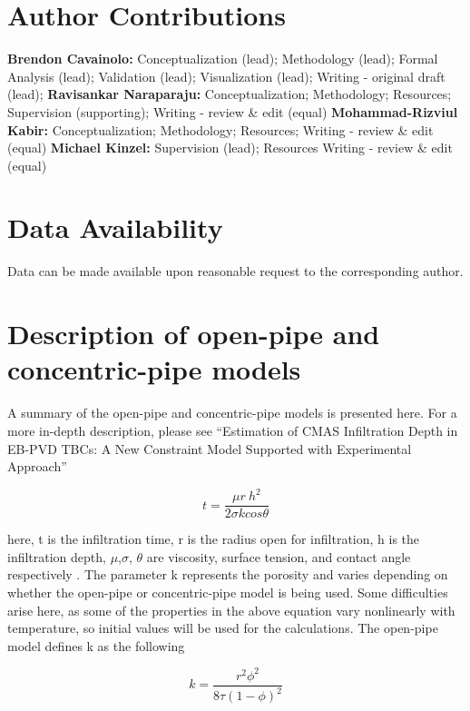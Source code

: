 \documentclass[%
 aip,
 amsmath,amssymb,
 reprint,%
floatfix]{revtex4-1}
\begin{document}
\section*{Author Contributions}
\textbf{Brendon Cavainolo:} Conceptualization (lead); Methodology (lead); Formal Analysis (lead); Validation (lead); Visualization (lead); Writing - original draft (lead);
\textbf{Ravisankar Naraparaju:} Conceptualization; Methodology; Resources; Supervision (supporting); Writing - review \& edit (equal)
\textbf{Mohammad-Rizviul Kabir:} Conceptualization; Methodology; Resources; Writing - review \& edit (equal)
\textbf{Michael Kinzel:} Supervision (lead); Resources Writing - review \& edit (equal)


\section*{Data Availability}
Data can be made available upon reasonable request to the corresponding author.

\appendix
\section{Description of open-pipe and concentric-pipe models}
\label{sec:app:RaviPipeModels}
A summary of the open-pipe and concentric-pipe models is presented here. For a more in-depth description, please see ``Estimation
of CMAS Infiltration Depth in EB-PVD TBCs: A New Constraint Model Supported with Experimental Approach''

\begin{equation}
    t=\frac{\mu r\ h^2}{2\sigma k cos\theta}
    \label{eq:PM_base}
\end{equation}

\noindent here, t is the infiltration time, r is the radius open for infiltration, h is the infiltration depth, $\mu$,$ \sigma$, $\theta$ are viscosity, surface tension, and contact angle respectively \cite{Naraparaju2017,ZHAO201474}. The parameter k represents the porosity and varies depending on whether the open-pipe or concentric-pipe model is being used. Some difficulties arise here, as some of the properties in the above equation vary nonlinearly with temperature, so initial values will be used for the calculations. The open-pipe model defines k as the following

\begin{equation}
    k=\frac{r^2\phi^2}{8\tau\left(1-\phi\right)^2}
    \label{eq:oPM}
\end{equation}
\end{document}
